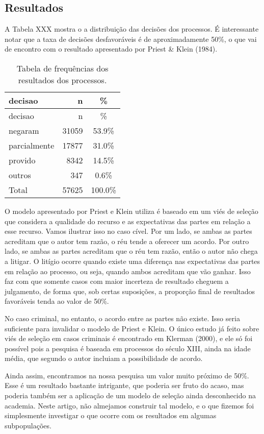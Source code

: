 \documentclass[10pt,]{article}
\begin{document}
\subsection{Resultados}\label{resultados}

A Tabela XXX mostra o a distribuição das decisões dos processos. É
interessante notar que a taxa de decisões desfavoráveis é de
aproximadamente 50\%, o que vai de encontro com o resultado apresentado
por Priest \& Klein (1984).

\begin{longtable}[c]{@{}lrc@{}}
\caption{Tabela de frequências dos resultados dos
processos.}\tabularnewline
\toprule
decisao & n & \%\tabularnewline
\midrule
\endfirsthead
\toprule
decisao & n & \%\tabularnewline
\midrule
\endhead
negaram & 31059 & 53.9\%\tabularnewline
parcialmente & 17877 & 31.0\%\tabularnewline
provido & 8342 & 14.5\%\tabularnewline
outros & 347 & 0.6\%\tabularnewline
Total & 57625 & 100.0\%\tabularnewline
\bottomrule
\end{longtable}

O modelo apresentado por Priest e Klein utiliza é baseado em um viés de
seleção que considera a qualidade do recurso e as expectativas das
partes em relação a esse recurso. Vamos ilustrar isso no caso cível. Por
um lado, se ambas as partes acreditam que o autor tem razão, o réu tende
a oferecer um acordo. Por outro lado, se ambas as partes acreditam que o
réu tem razão, então o autor não chega a litigar. O litígio ocorre
quando existe uma diferença nas expectativas das partes em relação ao
processo, ou seja, quando ambos acreditam que vão ganhar. Isso faz com
que somente casos com maior incerteza de resultado cheguem a julgamento,
de forma que, sob certas suposições, a proporção final de resultados
favoráveis tenda ao valor de 50\%.

No caso criminal, no entanto, o acordo entre as partes não existe. Isso
seria suficiente para invalidar o modelo de Priest e Klein. O único
estudo já feito sobre viés de seleção em casos criminais é encontrado em
Klerman (2000), e ele só foi possível pois a pesquisa é baseada em
processos do século XIII, ainda na idade média, que segundo o autor
incluiam a possibilidade de acordo.

Ainda assim, encontramos na nossa pesquisa um valor muito próximo de
50\%. Esse é um resultado bastante intrigante, que poderia ser fruto do
acaso, mas poderia também ser a aplicação de um modelo de seleção ainda
desconhecido na academia. Neste artigo, não almejamos construir tal
modelo, e o que fizemos foi simplesmente investigar o que ocorre com os
resultados em algumas subpopulações.
\end{document}
